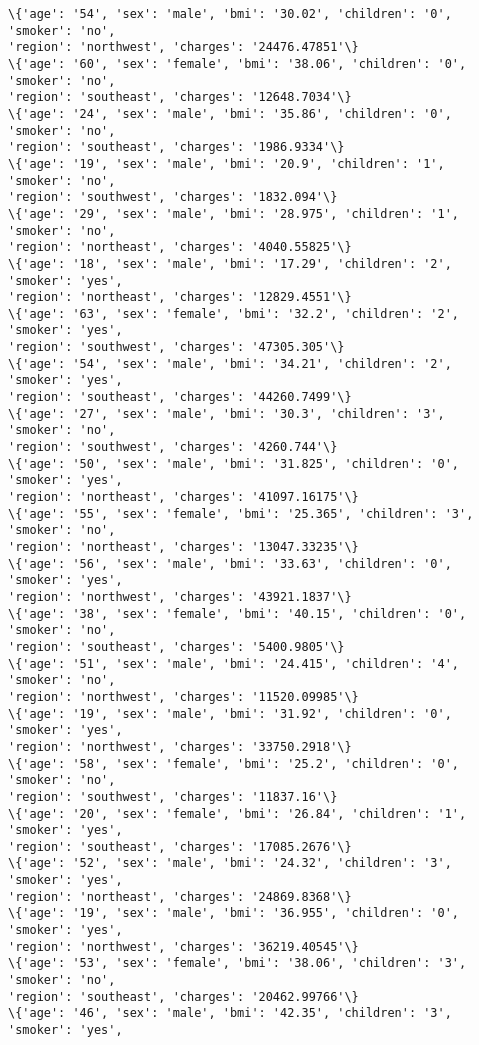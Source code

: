 \documentclass[11pt]{article}
\begin{document}
\begin{Verbatim}[commandchars=\\\{\}]
\{'age': '54', 'sex': 'male', 'bmi': '30.02', 'children': '0', 'smoker': 'no',
'region': 'northwest', 'charges': '24476.47851'\}
\{'age': '60', 'sex': 'female', 'bmi': '38.06', 'children': '0', 'smoker': 'no',
'region': 'southeast', 'charges': '12648.7034'\}
\{'age': '24', 'sex': 'male', 'bmi': '35.86', 'children': '0', 'smoker': 'no',
'region': 'southeast', 'charges': '1986.9334'\}
\{'age': '19', 'sex': 'male', 'bmi': '20.9', 'children': '1', 'smoker': 'no',
'region': 'southwest', 'charges': '1832.094'\}
\{'age': '29', 'sex': 'male', 'bmi': '28.975', 'children': '1', 'smoker': 'no',
'region': 'northeast', 'charges': '4040.55825'\}
\{'age': '18', 'sex': 'male', 'bmi': '17.29', 'children': '2', 'smoker': 'yes',
'region': 'northeast', 'charges': '12829.4551'\}
\{'age': '63', 'sex': 'female', 'bmi': '32.2', 'children': '2', 'smoker': 'yes',
'region': 'southwest', 'charges': '47305.305'\}
\{'age': '54', 'sex': 'male', 'bmi': '34.21', 'children': '2', 'smoker': 'yes',
'region': 'southeast', 'charges': '44260.7499'\}
\{'age': '27', 'sex': 'male', 'bmi': '30.3', 'children': '3', 'smoker': 'no',
'region': 'southwest', 'charges': '4260.744'\}
\{'age': '50', 'sex': 'male', 'bmi': '31.825', 'children': '0', 'smoker': 'yes',
'region': 'northeast', 'charges': '41097.16175'\}
\{'age': '55', 'sex': 'female', 'bmi': '25.365', 'children': '3', 'smoker': 'no',
'region': 'northeast', 'charges': '13047.33235'\}
\{'age': '56', 'sex': 'male', 'bmi': '33.63', 'children': '0', 'smoker': 'yes',
'region': 'northwest', 'charges': '43921.1837'\}
\{'age': '38', 'sex': 'female', 'bmi': '40.15', 'children': '0', 'smoker': 'no',
'region': 'southeast', 'charges': '5400.9805'\}
\{'age': '51', 'sex': 'male', 'bmi': '24.415', 'children': '4', 'smoker': 'no',
'region': 'northwest', 'charges': '11520.09985'\}
\{'age': '19', 'sex': 'male', 'bmi': '31.92', 'children': '0', 'smoker': 'yes',
'region': 'northwest', 'charges': '33750.2918'\}
\{'age': '58', 'sex': 'female', 'bmi': '25.2', 'children': '0', 'smoker': 'no',
'region': 'southwest', 'charges': '11837.16'\}
\{'age': '20', 'sex': 'female', 'bmi': '26.84', 'children': '1', 'smoker': 'yes',
'region': 'southeast', 'charges': '17085.2676'\}
\{'age': '52', 'sex': 'male', 'bmi': '24.32', 'children': '3', 'smoker': 'yes',
'region': 'northeast', 'charges': '24869.8368'\}
\{'age': '19', 'sex': 'male', 'bmi': '36.955', 'children': '0', 'smoker': 'yes',
'region': 'northwest', 'charges': '36219.40545'\}
\{'age': '53', 'sex': 'female', 'bmi': '38.06', 'children': '3', 'smoker': 'no',
'region': 'southeast', 'charges': '20462.99766'\}
\{'age': '46', 'sex': 'male', 'bmi': '42.35', 'children': '3', 'smoker': 'yes',

\end{Verbatim}
\end{document}
